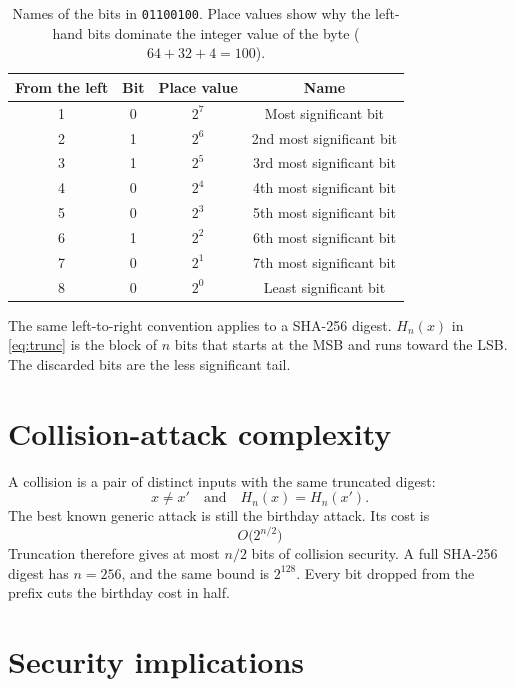 \documentclass[11pt,a4paper]{article}
\newcommand{\Hn}{H_{n}}
\begin{document}
\begin{table}[ht]
  \centering
  \caption{Names of the bits in \texttt{01100100}.
           Place values show why the left-hand bits dominate the integer
           value of the byte (\(64 + 32 + 4 = 100\)).}
  \label{tab:bits}
  \begin{tabular}{@{}cccc@{}}
    \toprule
    From the left & Bit & Place value & Name \\
    \midrule
    1 & 0 & \(2^{7}\) & Most significant bit \\
    2 & 1 & \(2^{6}\) & 2nd most significant bit \\
    3 & 1 & \(2^{5}\) & 3rd most significant bit \\
    4 & 0 & \(2^{4}\) & 4th most significant bit \\
    5 & 0 & \(2^{3}\) & 5th most significant bit \\
    6 & 1 & \(2^{2}\) & 6th most significant bit \\
    7 & 0 & \(2^{1}\) & 7th most significant bit \\
    8 & 0 & \(2^{0}\) & Least significant bit \\
    \bottomrule
  \end{tabular}
\end{table}

The same left-to-right convention applies to a SHA-256 digest.
\(\Hn(x)\) in \eqref{eq:trunc} is the block of \(n\) bits that starts at the
MSB and runs toward the LSB.
The discarded bits are the less significant tail.

\section{Collision-attack complexity}

A collision is a pair of distinct inputs with the same truncated digest:
\[
  x \neq x' \quad\text{and}\quad \Hn(x) = \Hn(x').
\]
The best known generic attack is still the birthday attack.
Its cost is
\begin{equation}
  \boxed{\,O\bigl(2^{n/2}\bigr)\,}
  \label{eq:birthday}
\end{equation}
Truncation therefore gives at most \(n/2\) bits of collision security.
A full SHA-256 digest has \(n = 256\), and the same bound is \(2^{128}\).
Every bit dropped from the prefix cuts the birthday cost in half.

\section{Security implications}
\end{document}

